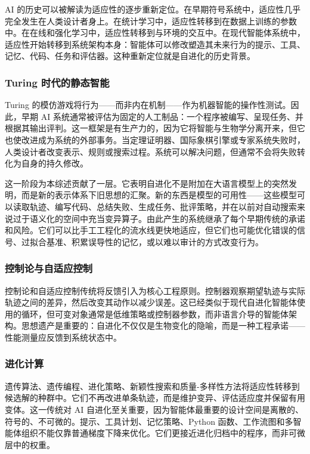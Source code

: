 AI 的历史可以被解读为适应性的逐步重新定位。在早期符号系统中，适应性几乎完全发生在人类设计者身上。在统计学习中，适应性转移到在数据上训练的参数中。在在线和强化学习中，适应性转移到与环境的交互中。在现代智能体系统中，适应性开始转移到系统架构本身：智能体可以修改塑造其未来行为的提示、工具、记忆、代码、任务和评估器。这种重新定位就是自进化的历史背景。

\subsubsection{Turing 时代的静态智能}

Turing 的模仿游戏将行为——而非内在机制——作为机器智能的操作性测试。因此，早期 AI 系统通常被评估为固定的人工制品：一个程序被编写、呈现任务、并根据其输出评判。这一框架是有生产力的，因为它将智能与生物学分离开来，但它也使改进成为系统的外部事务。当定理证明器、国际象棋引擎或专家系统失败时，人类设计者改变表示、规则或搜索过程。系统可以解决问题，但通常不会将失败转化为自身的持久修改。

这一阶段为本综述贡献了一层。它表明自进化不是附加在大语言模型上的突然发明，而是新的表示体系下旧思想的汇聚。新的东西是模型的可用性——这些模型可以读取轨迹、编写代码、总结失败、生成任务、批评策略，并在以前对自动搜索来说过于语义化的空间中充当变异算子。由此产生的系统继承了每个早期传统的承诺和风险。它们可以比手工工程化的流水线更快地适应，但它们也可能优化错误的信号、过拟合基准、积累误导性的记忆，或以难以审计的方式改变行为。

\subsubsection{控制论与自适应控制}

控制论和自适应控制传统将反馈引入为核心工程原则。控制器观察期望轨迹与实际轨迹之间的差异，然后改变其动作以减少误差。这已经类似于现代自进化智能体使用的循环，但可变对象通常是低维策略或控制器参数，而非语言介导的智能体架构。思想遗产是重要的：自进化不仅仅是生物变化的隐喻，而是一种工程承诺——性能测量应反馈到系统状态中。

\subsubsection{进化计算}

遗传算法、遗传编程、进化策略、新颖性搜索和质量-多样性方法将适应性转移到候选解的种群中。它们不再改进单条轨迹，而是维护变异、评估适应度并保留有用变体。这一传统对 AI 自进化至关重要，因为智能体最重要的设计空间是离散的、符号的、不可微的。提示、工具计划、记忆策略、Python 函数、工作流图和多智能体组织不能仅靠普通梯度下降来优化。它们更接近进化归档中的程序，而非可微层中的权重。

